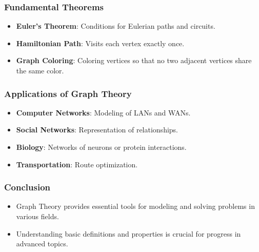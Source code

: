 \documentclass{beamer}
\begin{document}
	\begin{frame}
		\frametitle{Fundamental Theorems}
		\begin{itemize}
			\item \textbf{Euler's Theorem}: Conditions for Eulerian paths and circuits.
			\item \textbf{Hamiltonian Path}: Visits each vertex exactly once.
			\item \textbf{Graph Coloring}: Coloring vertices so that no two adjacent vertices share the same color.
		\end{itemize}
	\end{frame}
	
	\begin{frame}
		\frametitle{Applications of Graph Theory}
		\begin{itemize}
			\item \textbf{Computer Networks}: Modeling of LANs and WANs.
			\item \textbf{Social Networks}: Representation of relationships.
			\item \textbf{Biology}: Networks of neurons or protein interactions.
			\item \textbf{Transportation}: Route optimization.
		\end{itemize}
	\end{frame}
	
	\begin{frame}
		\frametitle{Conclusion}
		\begin{itemize}
			\item Graph Theory provides essential tools for modeling and solving problems in various fields.
			\item Understanding basic definitions and properties is crucial for progress in advanced topics.
		\end{itemize}
	\end{frame}
	
\end{document}
